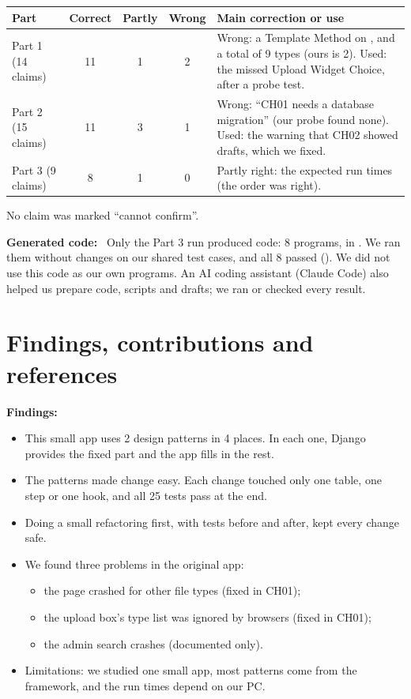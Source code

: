 \documentclass[11pt,a4paper]{article}
\newcommand{\field}[1]{\textbf{#1:}\ }
\newcommand{\code}[1]{\texttt{\detokenize{#1}}}
\begin{document}
{\small\begin{tabularx}{\linewidth}{@{}lcccL@{}}\toprule
Part & Correct & Partly & Wrong & Main correction or use\\\midrule
Part 1 (14 claims) & 11 & 1 & 2 & Wrong: a Template Method on \code{clean()}, and a total of 9 types (ours is 2). Used: the missed Upload Widget Choice, after a probe test.\\
Part 2 (15 claims) & 11 & 3 & 1 & Wrong: ``CH01 needs a database migration'' (our probe found none). Used: the warning that CH02 showed drafts, which we fixed.\\
Part 3 (9 claims) & 8 & 1 & 0 & Partly right: the expected run times (the order was right).\\\bottomrule
\end{tabularx}}

No claim was marked ``cannot confirm''.\par
\field{Generated code} Only the Part 3 run produced code: 8 programs, in .
We ran them without changes on our shared test cases, and all 8 passed ().
We did not use this code as our own programs.
An AI coding assistant (Claude Code) also helped us prepare code, scripts and drafts; we ran or checked every result.\par

\section{Findings, contributions and references}
\field{Findings}
\begin{itemize}
\item This small app uses 2 design patterns in 4 places. In each one, Django provides the fixed part and the app fills in the rest.
\item The patterns made change easy. Each change touched only one table, one step or one hook, and all 25 tests pass at the end.
\item Doing a small refactoring first, with tests before and after, kept every change safe.
\item We found three problems in the original app:
  \begin{itemize}
  \item the page crashed for other file types (fixed in CH01);
  \item the upload box's type list was ignored by browsers (fixed in CH01);
  \item the admin search crashes (documented only).
  \end{itemize}
\item Limitations: we studied one small app, most patterns come from the framework, and the run times depend on our PC.
\end{itemize}
\end{document}
